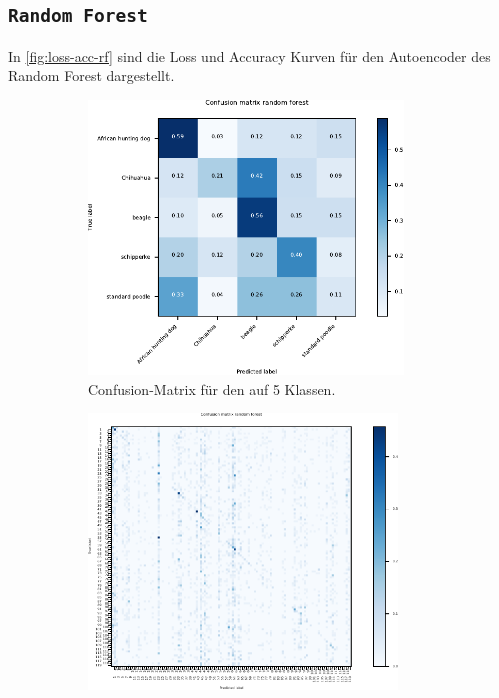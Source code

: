 \subsection{\texttt{Random Forest}}
In \autoref{fig:loss-acc-rf} sind die Loss und Accuracy Kurven für den
Autoencoder des Random Forest dargestellt.
\begin{figure}
  \begin{subfigure}{0.49\textwidth}
    \centering
    \includegraphics[width=0.92\textwidth]{pics/ergebnisse/RF/confusion_matrix_rf.pdf}
    \caption{Confusion-Matrix für den \RF{} auf 5 Klassen.}
    \label{sub:confusion-rf-5}
  \end{subfigure}
  \qquad
  \begin{subfigure}{0.49\textwidth}
    \centering
    \includegraphics[width=0.9\textwidth]{pics/ergebnisse/RF/confusion_matrix_numbers.pdf}

\end{subfigure}
\end{figure}
